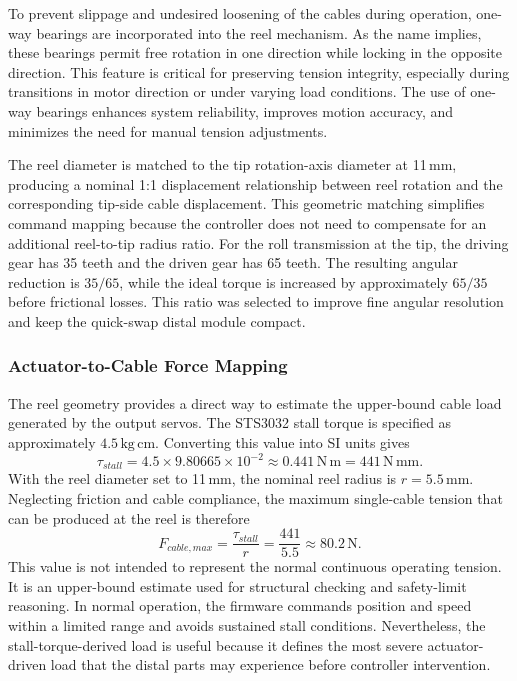 To prevent slippage and undesired loosening of the cables during operation, one-way bearings are incorporated into the reel mechanism. As the name implies, these bearings permit free rotation in one direction while locking in the opposite direction. This feature is critical for preserving tension integrity, especially during transitions in motor direction or under varying load conditions. The use of one-way bearings enhances system reliability, improves motion accuracy, and minimizes the need for manual tension adjustments.

The reel diameter is matched to the tip rotation-axis diameter at 11\,mm, producing a nominal 1:1 displacement relationship between reel rotation and the corresponding tip-side cable displacement. This geometric matching simplifies command mapping because the controller does not need to compensate for an additional reel-to-tip radius ratio. For the roll transmission at the tip, the driving gear has 35 teeth and the driven gear has 65 teeth. The resulting angular reduction is $35/65$, while the ideal torque is increased by approximately $65/35$ before frictional losses. This ratio was selected to improve fine angular resolution and keep the quick-swap distal module compact.

\subsubsection{Actuator-to-Cable Force Mapping}
The reel geometry provides a direct way to estimate the upper-bound cable load generated by the output servos. The STS3032 stall torque is specified as approximately $4.5\,\mathrm{kg\,cm}$. Converting this value into SI units gives
\[
\tau_{stall}=4.5 \times 9.80665 \times 10^{-2}
\approx 0.441\,\mathrm{N\,m}
=441\,\mathrm{N\,mm}.
\]
With the reel diameter set to 11\,mm, the nominal reel radius is $r=5.5\,\mathrm{mm}$. Neglecting friction and cable compliance, the maximum single-cable tension that can be produced at the reel is therefore
\[
F_{cable,max}=\frac{\tau_{stall}}{r}
=\frac{441}{5.5}
\approx 80.2\,\mathrm{N}.
\]
This value is not intended to represent the normal continuous operating tension. It is an upper-bound estimate used for structural checking and safety-limit reasoning. In normal operation, the firmware commands position and speed within a limited range and avoids sustained stall conditions. Nevertheless, the stall-torque-derived load is useful because it defines the most severe actuator-driven load that the distal parts may experience before controller intervention.

